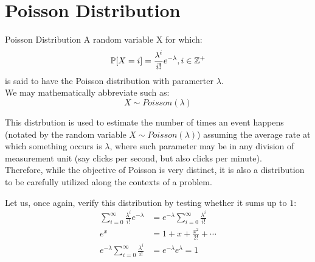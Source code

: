 \section{Poisson Distribution}
\begin{ln-define}{Poisson Distribution}{}
    A random variable X for which:
    \[\mathbb{P}[X = i] = \frac{\lambda^i}{i!} e^{-\lambda}, i \in \mathbb{Z}^+\]
    is said to have the Poisson distribution with paramerter $\lambda$. \\
    We may mathematically abbreviate such as:
    \[X \sim Poisson(\lambda)\]
\end{ln-define}
This distrbution is used to estimate the number of times an event happens (notated by the random variable $X \sim Poisson(\lambda)$) assuming the average rate at which something occurs is $\lambda$, where such parameter may be in any division of measurement unit (say clicks per second, but also clicks per minute). \\
Therefore, while the objective of Poisson is very distinct, it is also a distribution to be carefully utilized along the contexts of a problem.

Let us, once again, verify this distribution by testing whether it sums up to $1$:
\begin{align*}
    \sum_{i = 0}^\infty \frac{\lambda^i}{i!} e^{-\lambda}
    &= e^{-\lambda} \sum_{i = 0}^\infty \frac{\lambda^i}{i!} \\
    e^{x} &= 1 + x + \frac{x^2}{2!} + \cdots \\
    e^{-\lambda} \sum_{i = 0}^\infty \frac{\lambda^i}{i!}
    &= e^{-\lambda} e^{\lambda} = 1
\end{align*}

